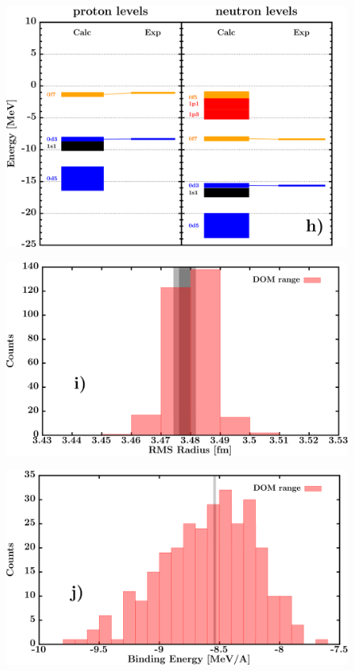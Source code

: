 \documentclass[twocolumn,secnumarabic,amssymb, nobibnotes, aps, prl,
superscriptaddress, nobalancelastpage, draft]{revtex4}
\begin{document}
\begin{figure}[!htb]
\begin{minipage}{0.4\linewidth}
        \label{DOM_ca40_chargeDensity}
    \end{minipage}\hspace{6pt}
    \begin{minipage}{0.4\linewidth}
        \centering
        \includegraphics[width=\linewidth]{figures/ca40_SPLevels.png}
        \label{DOM_ca40_SPLevels}
    \end{minipage}
    \begin{minipage}{0.4\linewidth}
        \centering
        \includegraphics[width=\linewidth]{figures/ca40_RMSRadius.png}
        \label{DOM_ca40_RMSRadius}
    \end{minipage}\hspace{6pt}
    \begin{minipage}{0.4\linewidth}
        \centering
        \includegraphics[width=\linewidth]{figures/ca40_BE.png}

\end{minipage}
\end{figure}
\end{document}
